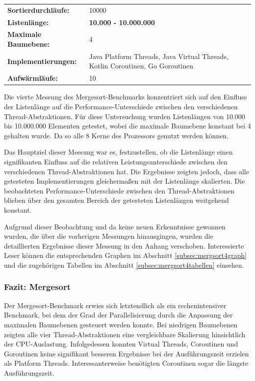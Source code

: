 \documentclass[fontsize=12pt,paper=a4,twoside=semi,parskip=half-,headsepline,headinclude]{scrreprt}
\begin{document}
\begin{tabularx}{\textwidth}{@{}lX@{}}
	\textbf{Sortierdurchläufe:} & 10000 \\
	\textbf{Listenlänge:} & \textbf{10.000 - 10.000.000} \\
	\textbf{Maximale Baumebene:} & 4 \\
	\textbf{Implementierungen:} & Java Platform Threads, Java Virtual Threads, Kotlin Coroutinen, Go Goroutinen \\
	\textbf{Aufwärmläufe:} & 10
\end{tabularx}

Die vierte Messung des Mergesort-Benchmarks konzentriert sich auf den Einfluss der Listenlänge auf die Performance-Unterschiede zwischen den verschiedenen Thread-Abstraktionen. Für diese Untersuchung wurden Listenlängen von 10.000 bis 10.000.000 Elementen getestet, wobei die maximale Baumebene konstant bei 4 gehalten wurde. Da so alle 8 Kerne des Prozessors genutzt werden können.

Das Hauptziel dieser Messung war es, festzustellen, ob die Listenlänge einen signifikanten Einfluss auf die relativen Leistungsunterschiede zwischen den verschiedenen Thread-Abstraktionen hat. Die Ergebnisse zeigten jedoch, dass alle getesteten Implementierungen gleichermaßen mit der Listenlänge skalierten. Die beobachteten Performance-Unterschiede zwischen den Thread-Abstraktionen blieben über den gesamten Bereich der getesteten Listenlängen weitgehend konstant.

Aufgrund dieser Beobachtung und da keine neuen Erkenntnisse gewonnen wurden, die über die vorherigen Messungen hinausgingen, wurden die detaillierten Ergebnisse dieser Messung in den Anhang verschoben. Interessierte Leser können die entsprechenden Graphen im Abschnitt \ref{subsec:mergsort4graph} und die zugehörigen Tabellen im Abschnitt \ref{subsec:mergsort4tabellen} einsehen.

\subsubsection{Fazit: Mergesort}

Der Mergesort-Benchmark erwies sich letztendlich als ein rechenintensiver Benchmark, bei dem der Grad der Parallelisierung durch die Anpassung der maximalen Baumebenen gesteuert werden konnte. Bei niedrigen Baumebenen zeigten alle vier Thread-Abstraktionen eine vergleichbare Skalierung hinsichtlich der CPU-Auslastung. Infolgedessen konnten Virtual Threads, Coroutinen und Goroutinen keine signifikant besseren Ergebnisse bei der Ausführungszeit erzielen als Platform Threads. Interessanterweise benötigten Coroutinen sogar die längste Ausführungszeit.
\end{document}
